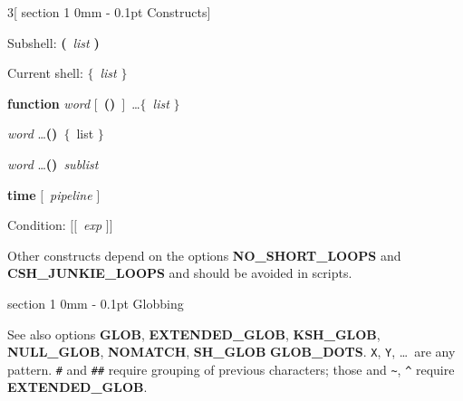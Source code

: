 \documentclass{article}
\makeatletter
\renewcommand{\section}{\@startsection
  {section}%
  {1}%
  {0mm}%
  {-\baselineskip}%
  {0.1pt}%
  {\normalfont\normalsize\scshape}} %
\newcommand{\codelabel}[1]{\mbox{\textsl{#1}}\hfil}
\newenvironment{code}%
{\begin{list}{}{\renewcommand{\makelabel}{\codelabel}%
    \setlength{\rightmargin}{0pt}%
    \setlength{\leftmargin}{1em}}}%
{\end{list}}
\newcommand\B[1]{\textbf{#1}}
\newcommand\I[1]{\textsl{#1}}
\newcommand\Lsq{\ensuremath{\boldsymbol{[}}}
\newcommand\Rsq{\ensuremath{\boldsymbol{]}}}
\newcommand\Lop{\ensuremath{[}}
\newcommand\Rop{\ensuremath{]}}
\newcommand\Lcu{\ensuremath{\mathbf{\{}}}
\newcommand\Rcu{\ensuremath{\mathbf{\}}}}
\newcommand\Lpa{\textbf{(}}
\newcommand\Rpa{\textbf{)}}
\makeatother
\begin{document}
\begin{multicols}{3}[\section{Constructs}]
\begin{code}
\item[Subshell:] \Lpa\ \I{list} \Rpa

\item[Current shell:] \Lcu\ \I{list} \Rcu

\item \B{function} \I{word} \Lop\ \Lpa\Rpa\ \Rop\ \dots \Lcu\ \I{list}
  \Rcu

\I{word} \dots \Lpa\Rpa\ \Lcu\ list \Rcu

\I{word} \dots \Lpa\Rpa\ \I{sublist}

\item \B{time} \Lop\ \I{pipeline} \Rop

\item[Condition:] \Lsq\Lsq\ \I{exp} \Rsq\Rsq
\end{code}

Other constructs depend on the options \B{NO\_\-SHORT\_\-LOOPS} and
\B{CSH\_\-JUNKIE\_\-LOOPS} and should be avoided in scripts.

\end{multicols}

\section{Globbing}

See also options \B{GLOB}, \B{EXTENDED\_\-GLOB}, \B{KSH\_\-GLOB},
\B{NULL\_\-GLOB}, \B{NOMATCH}, \B{SH\_\-GLOB} \B{GLOB\_\-DOTS}. \texttt{X},
\texttt{Y}, \dots\ are any pattern. \verb!#! and \verb!##! require grouping
of previous characters; those and \verb!~!, \verb!^! require
\B{EXTENDED\_\-GLOB}.
\end{document}
